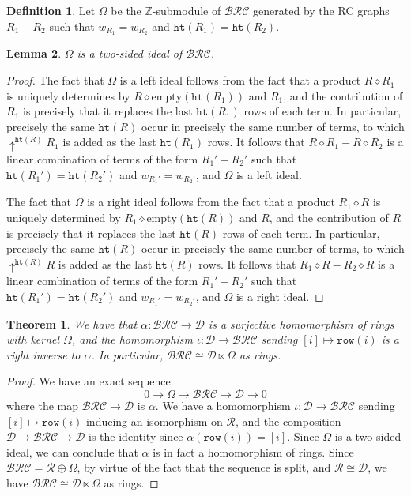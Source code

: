 \documentclass{amsart}
\newtheorem{lemma}{Lemma}[subsection]
\newtheorem{theorem}{Theorem}[section]
\theoremstyle{definition}
\newtheorem{definition}[lemma]{Definition}
\theoremstyle{remark}
\numberwithin{equation}{subsection}
\newcommand{\shup}{{\uparrow}}
\newcommand{\wof}[1]{w_{#1}}
\newcommand{\hr}{\mathtt{ht}}
\newcommand{\BRC}{\mathcal{BRC}}
\newcommand{\dcoma}{\mathcal{D}}
\begin{document}
\begin{definition}
Let $\Omega$ be the $\mathbb{Z}$-submodule of $\BRC$ generated by the RC graphs $R_1-R_2$ such that $\wof{R_1}=\wof{R_2}$ and $\hr(R_1)=\hr(R_2)$.
\end{definition}

\begin{lemma}
$\Omega$ is a two-sided ideal of $\BRC$.
\end{lemma}
\begin{proof}
  The fact that $\Omega$ is a left ideal follows from the fact that a product $R\diamond R_1$ is uniquely determines by $R\diamond \mathrm{empty}(\hr(R_1))$ and $R_1$, and the contribution of $R_1$ is precisely that it replaces the last $\hr(R_1)$ rows of each term. In particular, precisely the same $\hr(R)$ occur in precisely the same number of terms, to which $\shup^{\hr(R)}R_1$ is added as the last $\hr(R_1)$ rows. It follows that $R\diamond R_1 - R\diamond R_2$ is a linear combination of terms of the form $R_1' - R_2'$ such that $\hr(R_1') = \hr(R_2')$ and $\wof{R_1'} = \wof{R_2'}$, and $\Omega$ is a left ideal.

  The fact that $\Omega$ is a right ideal follows from the fact that a product $R_1\diamond R$ is uniquely determined by $R_1\diamond \mathrm{empty}(\hr(R))$ and $R$, and the contribution of $R$ is precisely that it replaces the last $\hr(R)$ rows of each term. In particular, precisely the same $\hr(R)$ occur in precisely the same number of terms, to which $\shup^{\hr(R)}R$ is added as the last $\hr(R)$ rows. It follows that $R_1\diamond R - R_2\diamond R$ is a linear combination of terms of the form $R_1' - R_2'$ such that $\hr(R_1') = \hr(R_2')$ and $\wof{R_1'} = \wof{R_2'}$, and $\Omega$ is a right ideal.
\end{proof}

\begin{theorem} \label{theorem:semidirect}
  We have that $\alpha:\BRC\to \dcoma$ is a surjective homomorphism of rings with kernel $\Omega$, and the homomorphism $\iota:\dcoma\to\BRC$ sending $[i]\mapsto \mathtt{row}(i)$ is a right inverse to $\alpha$. In particular, $\BRC\cong \dcoma\ltimes \Omega$ as rings.
\end{theorem}
\begin{proof}
  We have an exact sequence
$$0\to \Omega\to \BRC\to \dcoma\to 0$$
where the map $\BRC\to \dcoma$ is $\alpha$. We have a homomorphism $\iota:\dcoma\to \BRC$ sending $[i]\mapsto \mathtt{row}(i)$ inducing an isomorphism on $\mathcal{R}$, and the composition $\dcoma\to \BRC\to \dcoma$ is the identity since $\alpha(\mathtt{row}(i)) = [i]$. Since $\Omega$ is a two-sided ideal, we can conclude that $\alpha$ is in fact a homomorphism of rings. Since $\BRC = \mathcal{R}\oplus \Omega$, by virtue of the fact that the sequence is split, and $\mathcal{R}\cong \dcoma$, we have $\BRC\cong \dcoma\ltimes \Omega$ as rings.
\end{proof}
\end{document}
